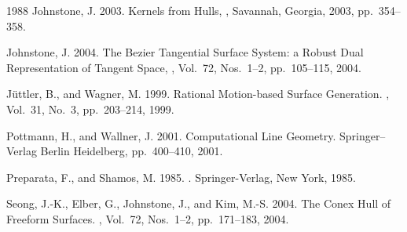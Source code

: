 \documentclass{acmsiggraph}
\begin{document}
\begin{thebibliography}{\protect{}1988}
{\sc Johnstone, J. 2003.}  
\newblock Kernels from Hulls, 
, 
Savannah, Georgia, 2003, pp.~354--358.

{\sc Johnstone, J. 2004.}
\newblock The Bezier Tangential Surface System: 
a Robust Dual Representation of Tangent Space,
, Vol.~72, Nos.~1--2, pp.~105--115, 2004.

{\sc J\"uttler, B., and Wagner, M. 1999.}
\newblock Rational Motion-based Surface Generation.
,
Vol.~31, No.~3, pp.~203--214, 1999.

{\sc Pottmann, H., and Wallner, J. 2001.}
\newblock Computational Line Geometry.
\newblock Springer--Verlag Berlin Heidelberg, pp.~400--410, 2001.

{\sc Preparata, F., and Shamos, M. 1985.}
.
\newblock Springer-Verlag, New York, 1985.

{\sc Seong, J.-K., Elber, G., Johnstone, J., and Kim, M.-S. 2004.}
\newblock The Conex Hull of Freeform Surfaces.
, Vol.~72, Nos.~1--2, pp.~171--183, 2004.

\end{thebibliography}

\end{document}
